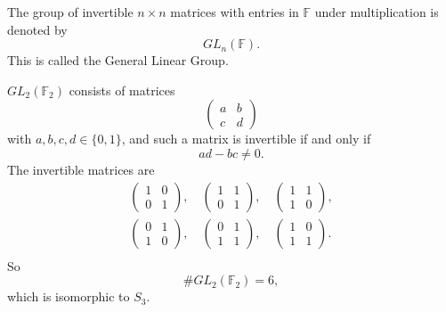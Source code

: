 \begin{definition}
    The group of invertible $n\times n$ matrices with entries in $\mathbb{F}$ under multiplication is denoted by
    \[
        GL_n(\mathbb{F}).
    \]
    This is called the General Linear Group.
\end{definition}

\begin{example}
    $GL_2(\mathbb{F}_2)$ consists of matrices
    \[
        \begin{pmatrix}
            a&b\\
            c&d
        \end{pmatrix}
    \]
    with $a,b,c,d\in\{0,1\}$, and such a matrix is invertible if and only if
    \[
        ad-bc\neq 0.
    \]
    The invertible matrices are
    \begin{gather*}
        \begin{pmatrix}
            1&0\\
            0&1
        \end{pmatrix},
        \quad
        \begin{pmatrix}
            1&1\\
            0&1
        \end{pmatrix},
        \quad
        \begin{pmatrix}
            1&1\\
            1&0
        \end{pmatrix},\\
        \begin{pmatrix}
            0&1\\
            1&0
        \end{pmatrix},
        \quad
        \begin{pmatrix}
            0&1\\
            1&1
        \end{pmatrix},
        \quad
        \begin{pmatrix}
            1&0\\
            1&1
        \end{pmatrix}.\\
    \end{gather*}
    So
    \[
        \#GL_2(\mathbb{F}_2)=6,
    \]
    which is isomorphic to $S_3$.
\end{example}

